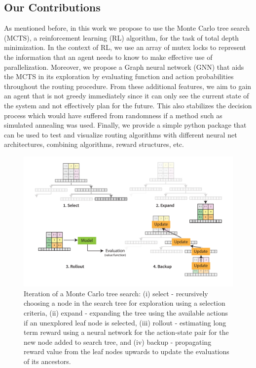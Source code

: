 \documentclass[%
 reprint,
amsmath,amssymb,
pra,
]{revtex4-2}
\begin{document}
\subsection{\label{sec:intro-contribution}Our Contributions}

As mentioned before, in this work we propose to use the Monte Carlo tree search (MCTS), a reinforcement learning (RL) algorithm, for the task of total depth minimization. In the context of RL, we use an array of mutex locks to represent the information that an agent needs to know to make effective use of parallelization. Moreover, we propose a Graph neural network (GNN) that aids the MCTS in its exploration by evaluating function and action probabilities throughout the routing procedure. From these additional features, we aim to gain an agent that is not greedy immediately since it can only see the current state of the system and not effectively plan for the future. This also stabilizes the decision process which would have suffered from randomness if a method such as simulated annealing was used. Finally, we provide a simple python package that can be used to test and visualize routing algorithms with different neural net architectures, combining algorithms, reward structures, etc. \citep{codebase}

\begin{figure}[ht]
    \includegraphics[width=\linewidth]{images/Search.pdf}
    \caption{\label{fig:mcts-explainer}
        Iteration of a Monte Carlo tree search: (i) select - recursively choosing a node in the search tree for exploration using a selection criteria, (ii) expand - expanding the tree using the available actions if an unexplored leaf node is selected, (iii) rollout - estimating long term reward using a neural network for the action-state pair for the new node added to search tree, and (iv) backup - propagating reward value from the leaf nodes upwards to update the evaluations of its ancestors.}
\end{figure}
\end{document}
